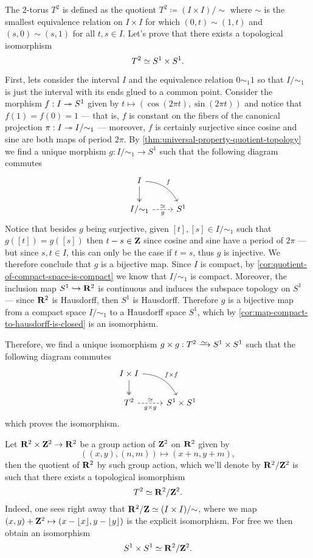 \begin{example}[Torus \(T^2\)]
\label{exp:T2-isomorphic-S1*S1}
The \(2\)-torus \(T^2\) is defined as the quotient
\(T^2 \coloneq (I \times I)/{\sim}\) where \(\sim\) is the smallest equivalence
relation on \(I \times I\) for which \((0, t) \sim (1, t)\) and
\((s, 0) \sim (s, 1)\) for all \(t, s \in I\). Let's prove that there exists a
topological isomorphism
\[
T^2 \simeq S^1 \times S^1.
\]

First, lets consider the interval \(I\) and the equivalence relation
\(0 \sim_1 1\) so that \(I/{\sim_1}\) is just the interval with its ends glued to
a common point. Consider the morphism \(f: I \twoheadrightarrow S^1\) given by
\(t \mapsto (\cos(2 \pi t), \sin(2 \pi t))\) and notice that \(f(1) = f(0) = 1\)
--- that is, \(f\) is constant on the fibers of the canonical projection
\(\pi: I \twoheadrightarrow I/{\sim_1}\) --- moreover, \(f\) is certainly surjective since
cosine and sine are both maps of period \(2 \pi\). By
\cref{thm:universal-property-quotient-topology} we find a unique morphism
\(g: I/{\sim_1} \to S^1\) such that the following diagram commutes
\[
\begin{tikzcd}
I \ar[d, two heads] \ar[rd, bend left, "f"] & \\
I/{\sim_1} \ar[r, dashed, "\dis", "g"']     &S^1
\end{tikzcd}
\]
Notice that besides \(g\) being surjective, given \([t], [s] \in I/{\sim_1}\)
such that \(g([t]) = g([s])\) then \(t - s \in \mathbf{Z}\) since cosine and sine have a
period of \(2 \pi\) --- but since \(s, t \in I\), this can only be the case if
\(t = s\), thus \(g\) is injective. We therefore conclude that \(g\) is a
bijective map. Since \(I\) is compact, by
\cref{cor:quotient-of-compact-space-is-compact} we know that \(I/{\sim_1}\) is
compact. Moreover, the inclusion map \(S^1 \hookrightarrow \mathbf{R}^2\) is continuous and induces
the subspace topology on \(S^1\) --- since \(\mathbf{R}^2\) is Hausdorff, then \(S^1\)
is Hausdorff. Therefore \(g\) is a bijective map from a compact space
\(I/{\sim_1}\) to a Hausdorff space \(S^1\), which by
\cref{cor:map-compact-to-hausdorff-is-closed} is an isomorphism.

Therefore, we find a unique isomorphism
\(g \times g: T^2 \isoto S^1 \times S^1\) such that the following diagram
commutes
\[
\begin{tikzcd}
I \times I \ar[d, two heads] \ar[rd, bend left, "f \times f"] & \\
T^2 \ar[r, dashed, "\dis", "g \times g"']                     &S^1 \times S^1
\end{tikzcd}
\]
which proves the isomorphism.

Let \(\mathbf{R}^2 \times \mathbf{Z}^2 \to \mathbf{R}^2\) be a group action of \(\mathbf{Z}^2\) on \(\mathbf{R}^2\)
given by
\[
((x, y), (n, m)) \mapsto (x + n, y + m),
\]
then the quotient of \(\mathbf{R}^2\) by such group action, which we'll denote by
\(\mathbf{R}^2/\mathbf{Z}^2\) is such that there exists a topological isomorphism
\[
T^2 \simeq \mathbf{R}^2/\mathbf{Z}^2.
\]
Indeed, one sees right away that \(\mathbf{R}^2/\mathbf{Z} \simeq (I \times I)/{\sim}\), where we
map \((x, y) + \mathbf{Z}^2 \mapsto (x - \lfloor x \rfloor, y - \lfloor y \rfloor)\) is
the explicit isomorphism. For free we then obtain an isomorphism
\[
S^1 \times S^1 \simeq \mathbf{R}^2/\mathbf{Z}^2.
\]
\end{example}

